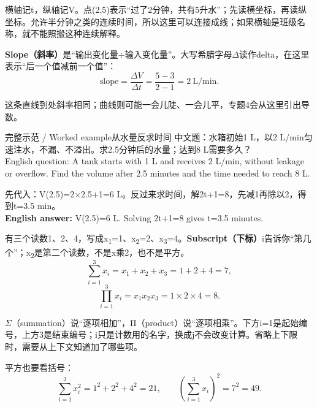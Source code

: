 横轴记t，纵轴记V。点(2,5)表示“过了2分钟，共有5升水”；先读横坐标，再读纵坐标。允许半分钟之类的连续时间，所以这里可以连接成线；如果横轴是班级名称，就不能照搬这种连续解释。


\begingroup\renewcommand{\StudyImageWidth}{.70\linewidth}
\endgroup




\textbf{Slope（斜率）}是“输出变化量\ensuremath{\div}输入变化量”。大写希腊字母\ensuremath{\Delta}读作delta，在这里表示“后一个值减前一个值”：
\[
\text{slope}=\frac{\Delta V}{\Delta t}=\frac{5-3}{2-1}=2\ \text{L/min}.\tag{M.2}
\]


这条直线到处斜率相同；曲线则可能一会儿陡、一会儿平，专题4会从这里引出导数。


\begin{StudyBlock}{完整示范 / Worked example}{从水量反求时间}
中文题：水箱初始1 L，以2 L/min匀速注水，不漏、不溢出。求2.5分钟后的水量；达到8 L需要多久？\\

English question: A tank starts with 1 L and receives 2 L/min, without leakage or overflow. Find the volume after 2.5 minutes and the time needed to reach 8 L.


先代入：V(2.5)=2\ensuremath{\times}2.5+1=6 L。反过来求时间，解2t+1=8，先减1再除以2，得到t=3.5 min。\\

\textbf{English answer:} V(2.5)=6 L. Solving 2t+1=8 gives t=3.5 minutes.
\end{StudyBlock}





有三个读数1、2、4，写成x\textsubscript{1}=1、x\textsubscript{2}=2、x\textsubscript{3}=4。\textbf{Subscript（下标）}i告诉你“第几个”；x\textsubscript{2}是第二个读数，不是x乘2，也不是平方。
\[
\sum_{i=1}^{3}x_i=x_1+x_2+x_3=1+2+4=7,\tag{M.3}
\]
\[
\prod_{i=1}^{3}x_i=x_1x_2x_3=1\times2\times4=8.\tag{M.4}
\]


\ensuremath{\Sigma}（summation）说“逐项相加”，Π（product）说“逐项相乘”。下方i=1是起始编号，上方3是结束编号；i只是计数用的名字，换成j不会改变计算。省略上下限时，需要从上下文知道加了哪些项。


平方也要看括号：
\[
\sum_{i=1}^{3}x_i^2=1^2+2^2+4^2=21,
\qquad\left(\sum_{i=1}^{3}x_i\right)^2=7^2=49.\tag{M.5}
\]


